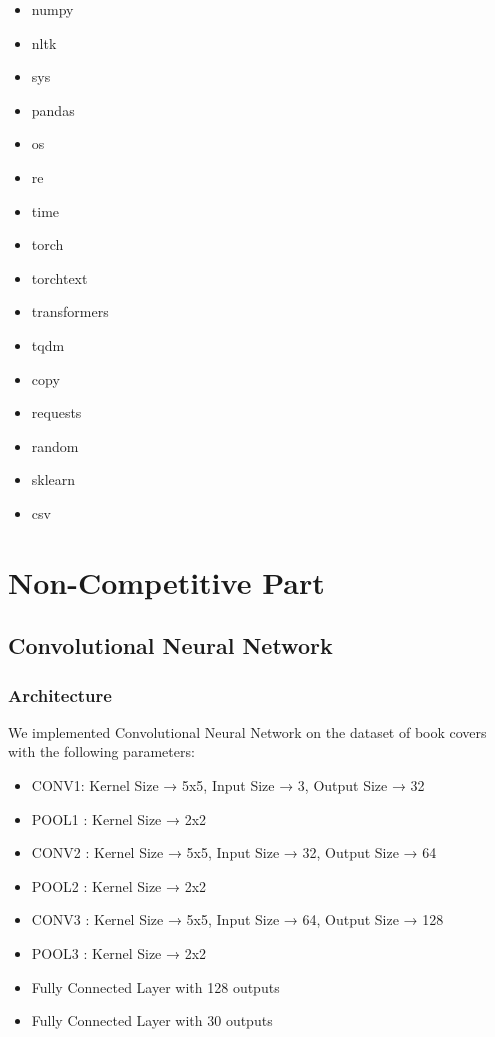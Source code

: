 \documentclass[11pt]{article}
\begin{document}
\begin{itemize}



    \item numpy
    \item nltk
    \item sys
    \item pandas
    \item os
    \item re
    \item time
    \item torch
    \item torchtext
    \item transformers
    \item tqdm
    \item copy
    \item requests
    \item random
    \item sklearn
    \item csv
\end{itemize}
\tableofcontents
\newpage
\section{Non-Competitive Part}
\subsection{Convolutional Neural Network}
\subsubsection{Architecture}
We implemented Convolutional Neural Network on the dataset of book covers with the following parameters:
\begin{itemize}
    \item CONV1: Kernel Size → 5x5, Input Size → 3, Output Size → 32
    \item POOL1 : Kernel Size → 2x2
    \item CONV2 : Kernel Size → 5x5, Input Size → 32, Output Size → 64
    \item POOL2 : Kernel Size → 2x2
    \item CONV3 : Kernel Size → 5x5, Input Size → 64, Output Size → 128
    \item POOL3 : Kernel Size → 2x2
    \item Fully Connected Layer with 128 outputs
    \item Fully Connected Layer with 30 outputs
\end{itemize}
\end{document}
